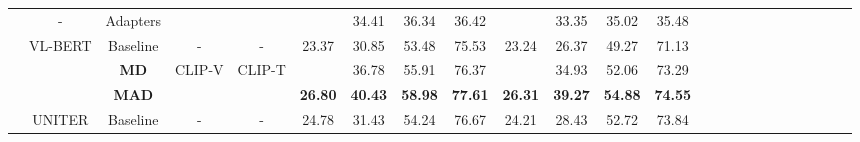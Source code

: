 \documentclass[runningheads]{llncs}
\begin{document}
\begin{table*}[]
\begin{center}
{\begin{tabular}{|c|c|c|cc|cccc|cccc|lllllllllll}
                                                                                   & -                                                                       & Adapters                             & \multicolumn{1}{c|}{}                        &                         &                      & 34.41                        & 36.34                         & 36.42                 &                      & 33.35                        & 35.02                         & 35.48                 &  &  &  &  &  &  &  &  &  &  &  \\ \cline{2-13}
                                                                                   & \multirow{3}{*}{VL-BERT}                                                & Baseline                             & \multicolumn{1}{c|}{-}                       & -                       & 23.37                & 30.85                        & 53.48                         & 75.53                 & 23.24                & 26.37                        & 49.27                         & 71.13                 &  &  &  &  &  &  &  &  &  &  &  \\ \cline{3-5}
                                                                                   &                                                                         & \textbf{MD}                   & \multicolumn{1}{c|}{\multirow{2}{*}{CLIP-V}} & \multirow{2}{*}{CLIP-T} &                      & 36.78                        & 55.91                         & 76.37                 &                      & 34.93                        & 52.06                         & 73.29                 &  &  &  &  &  &  &  &  &  &  &  \\ \cline{3-3}
                                                                                   &                                                                         & \textbf{MAD}                  & \multicolumn{1}{c|}{}                        &                         & \textbf{26.80}       & \textbf{40.43}               & \textbf{58.98}                & \textbf{77.61}        & \textbf{26.31}       & \textbf{39.27}               & \textbf{54.88}                & \textbf{74.55}        &  &  &  &  &  &  &  &  &  &  &  \\ \cline{2-13}
                                                                                   & \multirow{3}{*}{UNITER}                                                 & Baseline                             & \multicolumn{1}{c|}{-}                       & -                       & 24.78                & 31.43                        & 54.24                         & 76.67                 & 24.21                & 28.43                        & 52.72                         & 73.84                 &  &  &  &  &  &  &  &  &  &  &  \\ \cline{3-5}

\end{tabular}}
\end{center}
\end{table*}
\end{document}
